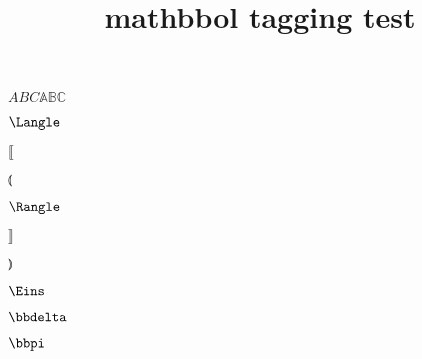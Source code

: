 \documentclass{article}
\title{mathbbol tagging test}
\begin{document}
$ABC\mathbb{ABC}$

$\Langle$\par
$\Lbrack$\par
$\Lparen$\par
$\Rangle$\par
$\Rbrack$\par
$\Rparen$\par
$\Eins$\par
$\bbdelta$\par
$\bbpi$\par
\end{document}
